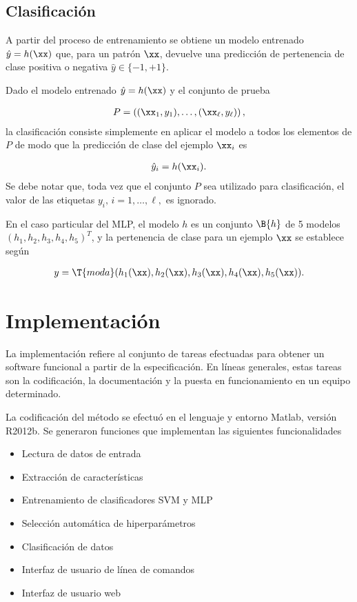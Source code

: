 \section{Clasificación}
A partir del proceso de entrenamiento se obtiene un modelo entrenado
$\hat{y} = h(\xx)$ que, para un patrón $\xx$, devuelve una predicción
de pertenencia de clase positiva o negativa $\hat{y}\in\{-1,+1\}$.

Dado el modelo entrenado $\hat{y} = h(\xx)$ y el conjunto de prueba

\begin{align*}
  P = \left( (\xx_1,y_1),\ldots,(\xx_\ell,y_\ell) \right),
\end{align*}
la clasificación consiste simplemente en aplicar el modelo a todos los
elementos de $P$ de modo que la predicción de clase del ejemplo
$\xx_i$ es

\begin{align*}
  \hat{y}_i = h(\xx_i).
\end{align*}
Se debe notar que, toda vez que el conjunto $P$ sea utilizado para
clasificación, el valor de las etiquetas $y_i,\,i=1,\ldots,\ell,$ es
ignorado.

En el caso particular del MLP, el modelo $h$ es un conjunto $\B{h}$
de 5 modelos $(h_1, h_2, h_3, h_4, h_5)^T$, y la pertenencia de clase para
un ejemplo $\xx$ se establece según

\begin{align}
  y = \T{moda}( h_1(\xx), h_2(\xx), h_3(\xx), h_4(\xx), h_5(\xx)).
\end{align}

\chapter{Implementación}
La implementación refiere al conjunto de tareas efectuadas para
obtener un software funcional a partir de la especificación. En líneas
generales, estas tareas son la codificación, la documentación y la
puesta en funcionamiento en un equipo determinado.

La codificación del método se efectuó en el lenguaje y entorno Matlab,
versión R2012b. Se generaron funciones que implementan las siguientes
funcionalidades

\begin{itemize}
\item Lectura de datos de entrada
\item Extracción de características
\item Entrenamiento de clasificadores SVM y MLP
\item Selección automática de hiperparámetros
\item Clasificación de datos
\item Interfaz de usuario de línea de comandos
\item Interfaz de usuario web
\end{itemize}